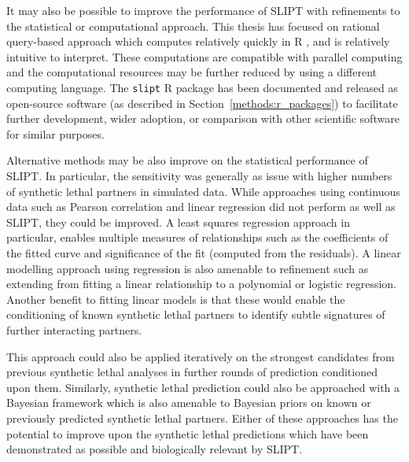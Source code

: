 It may also be possible to improve the performance of \gls{SLIPT} with refinements to the statistical or computational approach. This thesis has focused on rational query-based approach which computes relatively quickly in R \citep{R_core}, and is relatively intuitive to interpret. These computations are compatible with parallel computing and the computational resources may be further reduced by using a different computing language. The \texttt{slipt} R package has been documented and released as open-source software (as described in Section~\ref{methods:r_packages}) to facilitate further development, wider adoption, or comparison with other scientific software for similar purposes. 

Alternative methods may be also improve on the statistical performance of \gls{SLIPT}. In particular, the sensitivity was generally as issue with higher numbers of \gls{synthetic lethal} partners in simulated data. While approaches using continuous data such as Pearson correlation and linear regression did not perform as well as \gls{SLIPT}, they could be improved. A least squares regression approach in particular, enables multiple measures of relationships such as the coefficients of the fitted curve and significance of the fit (computed from the residuals). A linear modelling approach using regression is also amenable to refinement such as extending from fitting a linear relationship to a polynomial or logistic regression. Another benefit to fitting linear models is that these would enable the conditioning of known \gls{synthetic lethal} partners to identify subtle signatures of further interacting partners.

This approach could also be applied iteratively on the strongest candidates from previous \gls{synthetic lethal} analyses in further rounds of prediction conditioned upon them. Similarly, \gls{synthetic lethal} prediction could also be approached with a Bayesian framework \citep{Friedman2000, Jansen2003, Imoto2004} which is also amenable to Bayesian priors on known or previously predicted \gls{synthetic lethal} partners. Either of these approaches has the potential to improve upon the \gls{synthetic lethal} predictions which have been demonstrated as possible and biologically relevant by \gls{SLIPT}. 